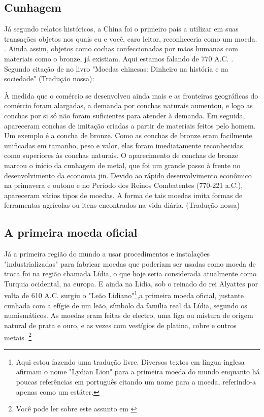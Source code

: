 \subsection{Cunhagem}
Já segundo relatos históricos, a China foi o primeiro país a utilizar em suas transações objetos nos quais eu e você, caro leitor, reconheceria como um moeda. . Ainda assim, objetos como cochas confeccionadas por mãos humanas com materiais como o bronze, já existiam. Aqui estamos falando de 770 A.C. . Segundo citação de \cite{CHINA} no livro "Moedas chinesas: Dinheiro na história e na sociedade" (Tradução nossa):

\begin{citacao}
 À medida que o comércio se desenvolveu ainda mais e as fronteiras geográficas do comércio foram alargadas, a demanda por conchas naturais aumentou, e logo as conchas por si só não foram suficientes para atender à demanda. Em seguida, apareceram conchas de imitação criadas a partir de materiais feitos pelo homem. Um exemplo é a concha de bronze. Como as conchas de bronze eram facilmente unificadas em tamanho, peso e valor, elas foram imediatamente reconhecidas como superiores às conchas naturais. O aparecimento de conchas de bronze marcou o início da cunhagem de metal, que foi um grande passo à frente no desenvolvimento da economia jin. Devido ao rápido desenvolvimento econômico na primavera e outono e no Período dos Reinos Combatentes (770-221 a.C.), apareceram vários tipos de moedas. A forma de tais moedas imita formas de ferramentas agrícolas ou itens encontrados na vida diária. (Tradução nossa)
	\end{citacao}

\subsection{A primeira moeda oficial}
Já a primeira região do mundo a usar procedimentos e instalações "industrializadas" para fabricar moedas que poderiam ser usadas como moeda de troca foi na região chamada Lídia, o que hoje seria considerada atualmente como Turquia ocidental, na europa. E ainda na Lídia, sob o reinado do rei Alyattes  por volta de 610 A.C. surgiu o  "Leão Lidiano"\footnote{Aqui estou fazendo uma tradução livre. Diversos textos em língua inglesa afirmam o nome "Lydian Lion" para a primeira moeda do mundo enquanto há poucas referências em português citando um nome para a moeda, referindo-a apenas como um estáter.},a primeira moeda oficial, justante cunhada com a efígie de um leão, símbolo da família real da Lídia, segundo os numismáticos. As moedas eram feitas de electro, uma liga ou mistura de origem natural de prata e ouro, e as vezes com vestígios de platina, cobre e outros metais. \footnote{Você pode ler sobre este assunto em \cite{MONTEREY}}

